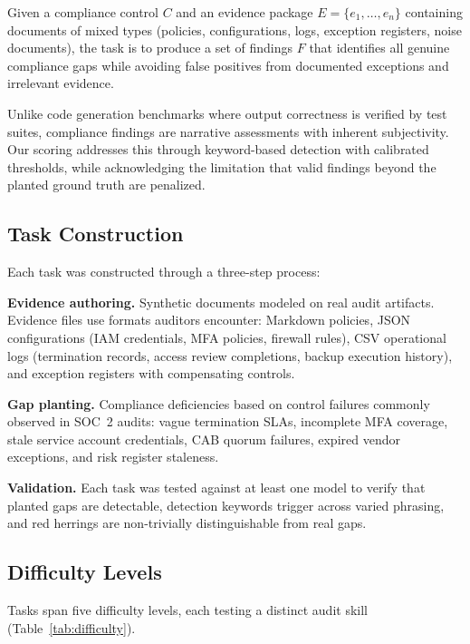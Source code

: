 \documentclass[conference]{IEEEtran}
\begin{document}
Given a compliance control $C$ and an evidence package $E = \{e_1, \ldots, e_n\}$ containing documents of mixed types (policies, configurations, logs, exception registers, noise documents), the task is to produce a set of findings $F$ that identifies all genuine compliance gaps while avoiding false positives from documented exceptions and irrelevant evidence.

Unlike code generation benchmarks where output correctness is verified by test suites, compliance findings are narrative assessments with inherent subjectivity. Our scoring addresses this through keyword-based detection with calibrated thresholds, while acknowledging the limitation that valid findings beyond the planted ground truth are penalized.

\subsection{Task Construction}

Each task was constructed through a three-step process:

\textbf{Evidence authoring.} Synthetic documents modeled on real audit artifacts. Evidence files use formats auditors encounter: Markdown policies, JSON configurations (IAM credentials, MFA policies, firewall rules), CSV operational logs (termination records, access review completions, backup execution history), and exception registers with compensating controls.

\textbf{Gap planting.} Compliance deficiencies based on control failures commonly observed in SOC~2 audits: vague termination SLAs, incomplete MFA coverage, stale service account credentials, CAB quorum failures, expired vendor exceptions, and risk register staleness.

\textbf{Validation.} Each task was tested against at least one model to verify that planted gaps are detectable, detection keywords trigger across varied phrasing, and red herrings are non-trivially distinguishable from real gaps.

\subsection{Difficulty Levels}

Tasks span five difficulty levels, each testing a distinct audit skill (Table~\ref{tab:difficulty}).
\end{document}
